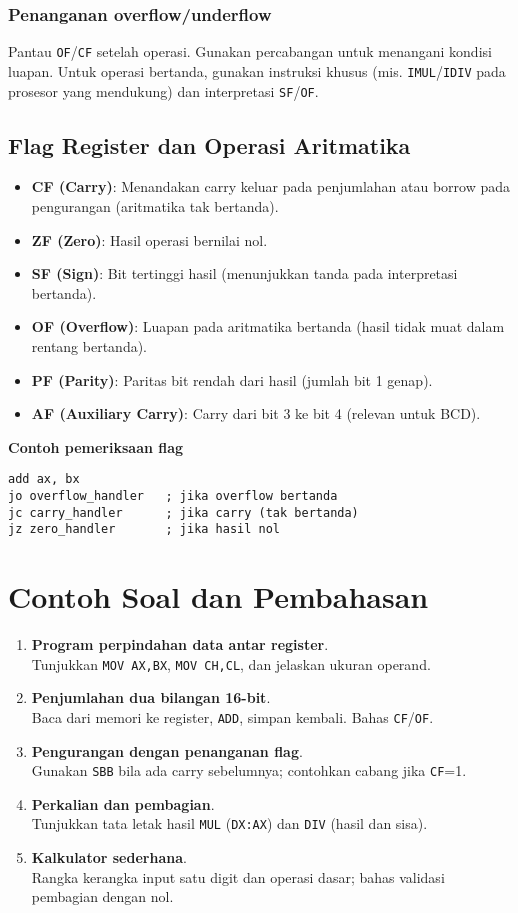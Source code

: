 \subsubsection{Penanganan overflow/underflow}
Pantau \texttt{OF}/\texttt{CF} setelah operasi. Gunakan percabangan untuk menangani kondisi luapan. Untuk operasi bertanda, gunakan instruksi khusus (mis. \texttt{IMUL}/\texttt{IDIV} pada prosesor yang mendukung) dan interpretasi \texttt{SF}/\texttt{OF}.

\subsection{Flag Register dan Operasi Aritmatika}
\begin{itemize}
  \item \textbf{CF (Carry)}: Menandakan carry keluar pada penjumlahan atau borrow pada pengurangan (aritmatika tak bertanda).
  \item \textbf{ZF (Zero)}: Hasil operasi bernilai nol.
  \item \textbf{SF (Sign)}: Bit tertinggi hasil (menunjukkan tanda pada interpretasi bertanda).
  \item \textbf{OF (Overflow)}: Luapan pada aritmatika bertanda (hasil tidak muat dalam rentang bertanda).
  \item \textbf{PF (Parity)}: Paritas bit rendah dari hasil (jumlah bit 1 genap).
  \item \textbf{AF (Auxiliary Carry)}: Carry dari bit 3 ke bit 4 (relevan untuk BCD).
\end{itemize}
\noindent\textbf{Contoh pemeriksaan flag}
\begin{verbatim}
add ax, bx
jo overflow_handler   ; jika overflow bertanda
jc carry_handler      ; jika carry (tak bertanda)
jz zero_handler       ; jika hasil nol
\end{verbatim}

\section{Contoh Soal dan Pembahasan}
\begin{enumerate}
  \item \textbf{Program perpindahan data antar register}.\\ Tunjukkan \texttt{MOV AX,BX}, \texttt{MOV CH,CL}, dan jelaskan ukuran operand.
  \item \textbf{Penjumlahan dua bilangan 16-bit}.\\ Baca dari memori ke register, \texttt{ADD}, simpan kembali. Bahas \texttt{CF}/\texttt{OF}.
  \item \textbf{Pengurangan dengan penanganan flag}.\\ Gunakan \texttt{SBB} bila ada carry sebelumnya; contohkan cabang jika \texttt{CF}=1.
  \item \textbf{Perkalian dan pembagian}.\\ Tunjukkan tata letak hasil \texttt{MUL} (\texttt{DX:AX}) dan \texttt{DIV} (hasil dan sisa).
  \item \textbf{Kalkulator sederhana}.\\ Rangka kerangka input satu digit dan operasi dasar; bahas validasi pembagian dengan nol.
\end{enumerate}

